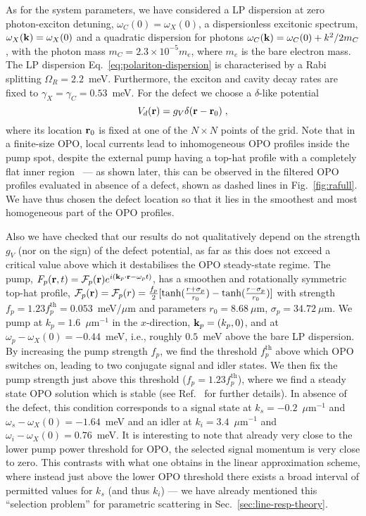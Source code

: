 As for the system parameters, we have considered a LP dispersion at
zero photon-exciton detuning, $\omega_C(0) = \omega_X(0)$, a
dispersionless excitonic spectrum, $\omega_X({\mathbf{k}}) = \omega_X(0)$
and a quadratic dispersion for photons
$\omega_C({\mathbf{k}}) = \omega_C(0) + k^2/2m_C$, with the photon mass
$m_C=2.3 \times 10^{-5} m_e$, where $m_e$ is the bare electron
mass. The LP dispersion Eq.~\eqref{eq:polariton-dispersion} is
characterised by a Rabi splitting $\Omega_R = 2.2$~meV. Furthermore,
the exciton and cavity decay rates are fixed to
$\gamma_X=\gamma_C=0.53$~meV.
%
For the defect we choose a $\delta$-like potential
%
\begin{equation}
  V_d(\mathbf{r}) = g_V \delta(\mathbf{r} - \mathbf{r}_0)\; ,
\end{equation}
%
where its location $\mathbf{r}_0$ is fixed at one of the $N \times N$
points of the grid.
%
Note that in a finite-size OPO, local currents lead to inhomogeneous
OPO profiles inside the pump spot, despite the external pump having
a top-hat profile with a completely flat inner
region~\cite{Marchetti_2010,9783642241857} --- as shown later, this
can be observed in the filtered OPO profiles evaluated in absence of a
defect, shown as dashed lines in Fig.~\ref{fig:rafull}.
%
We have thus chosen the defect location so that it lies in the
smoothest and most homogeneous part of the OPO profiles.

Also we have checked that our results do not qualitatively depend on
the strength $g_V$ (nor on the sign) of the defect potential, as far
as this does not exceed a critical value above which it destabilises
the OPO steady-state regime.
%
The pump, $F_p(\mathbf{r},t) = \mathcal{F}_p(\mathbf{r}) e^{i (\mathbf{k}_p
  \cdot \mathbf{r} - \omega_p t)}$, has a smoothen and rotationally
symmetric top-hat profile, $\mathcal{F}_p(\mathbf{r}) = \mathcal{F}_p(r)
= \frac{f_p}{2}[\tanh(\frac{r+\sigma_p}{r_0}) -
  \tanh(\frac{r-\sigma_p}{r_0})]$ with strength $f_p = 1.23
f_p^\text{th} = 0.053$~meV/$\mu$m and parameters $r_0 = 8.68~\mu$m,
$\sigma_p = 34.72~\mu$m.
%
We pump at $k_p=1.6$~$\mu$m$^{-1}$ in the $x$-direction, $\mathbf{k}_p =
(k_p,0)$, and at $\omega_p-\omega_X(0)=-0.44$~meV, i.e., roughly
$0.5$~meV above the bare LP dispersion. By increasing the pump
strength $f_p$, we find the threshold $f_p^{\text{th}}$ above which
OPO switches on, leading to two conjugate signal and idler states.
%
We then fix the pump strength just above this threshold ($f_p=1.23
f_p^{\text{th}}$), where we find a steady state OPO solution which is
stable (see Ref.~\cite{9783642241857} for further details). In
absence of the defect, this condition corresponds to a signal state at
$k_s=-0.2$~$\mu$m$^{-1}$ and $\omega_s-\omega_X(0) = -1.64$~meV and an
idler at $k_i=3.4$~$\mu$m$^{-1}$ and $\omega_i-\omega_X(0) =
0.76$~meV. 
%
It is interesting to note that already very close to the lower pump
power threshold for OPO, the selected signal momentum is very close to
zero. This contrasts with what one obtains in the linear approximation
scheme, where instead just above the lower OPO threshold there exists
a broad interval of permitted values for $k_s$ (and thus $k_i$) --- we
have already mentioned this ``selection problem'' for parametric
scattering in Sec.~\ref{sec:line-resp-theory}.

